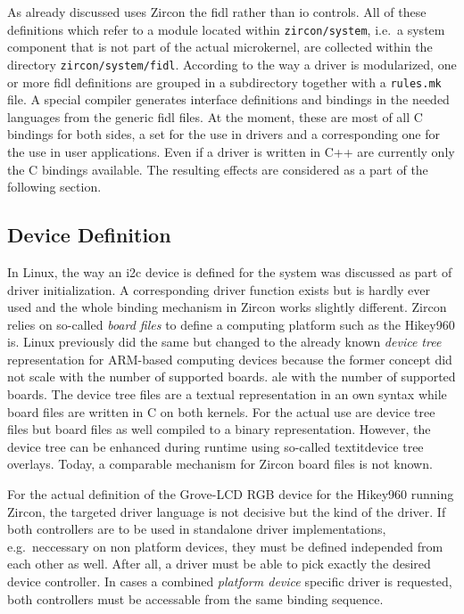 As already discussed uses Zircon the \acf{fidl} rather than \ac{io} controls.
All of these definitions which refer to a module located within \texttt{zircon/system}, i.e.\ a system component that is not part of the actual microkernel, are collected within the directory \texttt{zircon/system/fidl}.
According to the way a driver is modularized, one or more \ac{fidl} definitions are grouped in a subdirectory together with a \texttt{rules.mk} file.
A special compiler generates interface definitions and bindings in the needed languages from the generic \ac{fidl} files.
At the moment, these are most of all C bindings for both sides, a set for the use in drivers and a corresponding one for the use in user applications.
Even if a driver is written in C++ are currently only the C bindings available.
The resulting effects are considered as a part of the following section.

\subsection{Device Definition}
In Linux, the way an \ac{i2c} device is defined for the system was discussed as part of driver initialization.
A corresponding driver function exists but is hardly ever used and the whole binding mechanism in Zircon works slightly different.
Zircon relies on so-called \textit{board files} to define a computing platform such as the Hikey960 is.
Linux previously did the same but changed to the already known \textit{device tree} representation for ARM-based computing devices because the former concept did not scale with the number of supported boards.
ale with the number of supported boards.
The device tree files are a textual representation in an own syntax while board files are written in C on both kernels.
For the actual use are device tree files but board files as well compiled to a binary representation.
However, the device tree can be enhanced during runtime using so-called textit{device tree overlays}.
Today, a comparable mechanism for Zircon board files is not known.

For the actual definition of the Grove-LCD RGB device for the Hikey960 running Zircon, the targeted driver language is not decisive but the kind of the driver.
If both controllers are to be used in standalone driver implementations, e.g.\ neccessary on non platform devices, they must be defined independed from each other as well.
After all, a driver must be able to pick exactly the desired device controller.
In cases a combined \textit{platform device} specific driver is requested, both controllers must be accessable from the same binding sequence.

